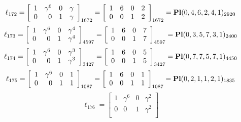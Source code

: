 \documentclass{article}
\begin{document}
{$$
\ell_{172} = 
\left[
\begin{array}{*{4}{r}}
1 & \gamma^{6} & 0 & \gamma \\
0 & 0 & 1 & \gamma \\
\end{array}
\right]
_{1672}
=
\left[
\begin{array}{*{4}c}
1  & 6  & 0  & 2\\
0  & 0  & 1  & 2\\
\end{array}
\right]_{1672}
={\rm\bf Pl}(0,4,6,2,4,1 )_{2920}$$
$$
\ell_{173} = 
\left[
\begin{array}{*{4}{r}}
1 & \gamma^{6} & 0 & \gamma^{4}\\
0 & 0 & 1 & \gamma^{4}\\
\end{array}
\right]
_{4597}
=
\left[
\begin{array}{*{4}c}
1  & 6  & 0  & 7\\
0  & 0  & 1  & 7\\
\end{array}
\right]_{4597}
={\rm\bf Pl}(0,3,5,7,3,1 )_{2400}$$
$$
\ell_{174} = 
\left[
\begin{array}{*{4}{r}}
1 & \gamma^{6} & 0 & \gamma^{3}\\
0 & 0 & 1 & \gamma^{3}\\
\end{array}
\right]
_{3427}
=
\left[
\begin{array}{*{4}c}
1  & 6  & 0  & 5\\
0  & 0  & 1  & 5\\
\end{array}
\right]_{3427}
={\rm\bf Pl}(0,7,7,5,7,1 )_{4450}$$
$$
\ell_{175} = 
\left[
\begin{array}{*{4}{r}}
1 & \gamma^{6} & 0 & 1\\
0 & 0 & 1 & 1\\
\end{array}
\right]
_{1087}
=
\left[
\begin{array}{*{4}c}
1  & 6  & 0  & 1\\
0  & 0  & 1  & 1\\
\end{array}
\right]_{1087}
={\rm\bf Pl}(0,2,1,1,2,1 )_{1835}$$
$$
\ell_{176} = 
\left[
\begin{array}{*{4}{r}}
1 & \gamma^{6} & 0 & \gamma^{2}\\
0 & 0 & 1 & \gamma^{2}\\
\end{array}
\right]
$$}
\end{document}
